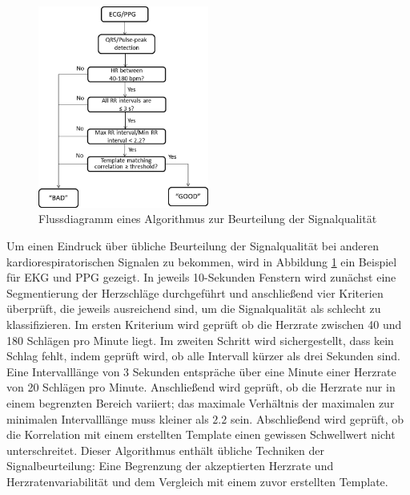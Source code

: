 	\begin{figure}[H]
		\centering
		\includegraphics[width=0.5\textwidth]{pic/ad_flussdiagramm}
		\caption[Flussdiagramm eines Algorithmus zur Beurteilung der Signalqualität]{Flussdiagramm eines Algorithmus zur Beurteilung der Signalqualität\protect\footnotemark}
		\label{fig:ecg-ad}
	\end{figure}
	
	Um einen Eindruck über übliche Beurteilung der Signalqualität bei anderen kardiorespiratorischen Signalen zu bekommen, wird in Abbildung \ref{fig:ecg-ad} ein Beispiel für \ac{EKG} und \ac{PPG} gezeigt. In jeweils 10-Sekunden Fenstern wird zunächst eine Segmentierung der Herzschläge durchgeführt und anschließend vier Kriterien überprüft, die jeweils ausreichend sind, um die Signalqualität als schlecht zu klassifizieren. Im ersten Kriterium wird geprüft ob die Herzrate zwischen 40 und 180 Schlägen pro Minute liegt. Im zweiten Schritt wird sichergestellt, dass kein Schlag fehlt, indem geprüft wird, ob alle Intervall kürzer als drei Sekunden sind. Eine Intervalllänge von 3 Sekunden entspräche über eine Minute einer Herzrate von 20 Schlägen pro Minute. Anschließend wird geprüft, ob die Herzrate nur in einem begrenzten Bereich variiert; das maximale Verhältnis der maximalen zur minimalen Intervalllänge muss kleiner als $2.2$ sein. Abschließend wird geprüft, ob die Korrelation mit einem erstellten Template einen gewissen Schwellwert nicht unterschreitet. Dieser Algorithmus enthält übliche Techniken der Signalbeurteilung: Eine Begrenzung der akzeptierten Herzrate und Herzratenvariabilität und dem Vergleich mit einem zuvor erstellten Template.
	
